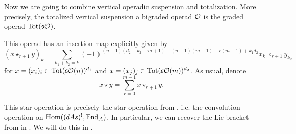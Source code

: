 \documentclass[Thesis.tex]{subfiles}
\begin{document}
Now we are going to combine vertical operadic suspension and totalization. More precisely, the totalized vertical suspension a bigraded operad ${\mathcal O}$ is the graded operad $\operatorname{Tot}(\mathfrak{s}{\mathcal O})$. 


This operad has an insertion map explicitly given by
\begin{equation}\label{star}
(x\star_{r+1} y)_k=\sum_{k_1+k_2=k}(-1)^{(n-1)(d_2-k_2-m+1)+(n-1)(m-1)+r(m-1)+k_1d_2}x_{k_1}\circ_{r+1}y_{k_2}
\end{equation}
for $x=(x_i)_i\in \operatorname{Tot}(\mathfrak{s}{\mathcal O}(n))^{d_1}$ and $x=(x_j)_j\in \operatorname{Tot}(\mathfrak{s}{\mathcal O}(m))^{d_2}$. As usual, denote \[x\star y=\sum_{r=0}^{m-1}x\star_{r+1}y.\]

This star operation is precisely the star operation from \cite[\S 5.1]{LRW}, i.e. the convolution operation on $\operatorname{Hom}((dAs)^{!}, \operatorname{End}_A)$. In particular, we can recover the Lie bracket from in \cite{LRW}. We will do this in .
\end{document}
